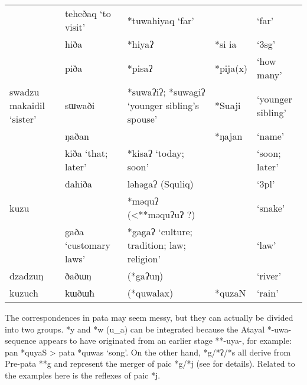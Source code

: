 \begin{longtable}[c]{>{\raggedright}p{2.7cm}>{\raggedright}p{2.7cm}>{\raggedright}p{2.7cm}ll}
                         & teheðaq `to visit'               & *tuwahiyaq `far'                              &          & `far'             \\
                         & hiða                             & *hiyaʔ                                        & *si ia   & `3\acs{sg}'       \\ \hdashline
                         & piða                             & *pisaʔ                                        & *pija(x) & `how many'        \\
swadzu makaidil `sister' & sɯwaði                           & *suwaʔiʔ; *suwagiʔ `younger sibling's spouse' & *Suaji   & `younger sibling' \\
                         & ŋaðan                            &                                               & *ŋajan   & `name'            \\
                         & kiða `that; later'               & *kisaʔ `today; soon'                          &          & `soon; later'     \\
                         & dahiða                           & ləhəgaʔ (Squliq)                              &          & `3\acs{pl}'       \\
kuzu                     &                                  & *məquʔ (<**məquʔuʔ ?)                         &          & `snake'           \\
                         & gaða `customary laws'            & *gagaʔ `culture; tradition; law; religion'    &          & `law'             \\ \hdashline
dzadzuŋ                  & ðaðɯŋ                            & (*gaʔuŋ)                                      &          & `river'           \\
kuzuch                   & kɯðɯħ                            & (*quwalax)                                    & *quzaN   & `rain'            \\ \hline
\end{longtable}  
\endgroup

The correspondences in \acl{pata} may seem messy, but they can actually be divided into two groups. *y and *w (u\_a) can be integrated because the Atayal *-uwa- sequence appears to have originated from an earlier stage **-uya-, for example: \ac{pan} *quyaS > \ac{pata} *quwas `song'. On the other hand, *g/*ʔ/*s all derive from Pre-\acl{pata} **g and represent the merger of \acl{paic} *g/*j (see \cite{song2023Aicgprime} for details). Related to the examples here is the reflexes of \acl{paic} *j.

